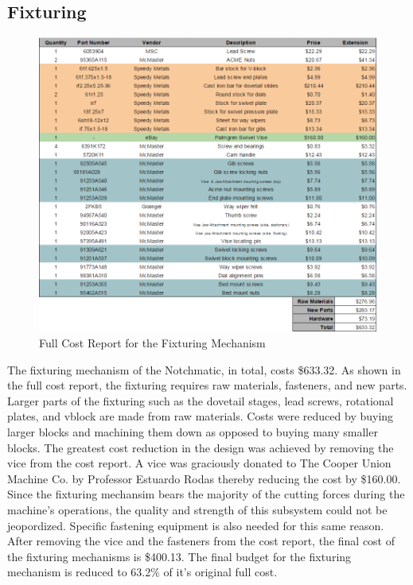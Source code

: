 \newpage

\subsection{Fixturing}

\begin{figure}[H]
    \centering
    \includegraphics[width=1.0\textwidth]{./images/Chapter4-BillofMaterials/CRF}
    \caption{Full Cost Report for the Fixturing Mechanism}
    \label{fig:CRD}
\end{figure}

The fixturing mechanism of the Notchmatic, in total, costs \$633.32. As shown in the full cost report, the fixturing requires raw materials, fasteners, and new parts. Larger parts of the fixturing such as the dovetail stages, lead screws, rotational plates, and vblock are made from raw materials. Costs were reduced by buying larger blocks and machining them down as opposed to buying many smaller blocks. The greatest cost reduction in the design was achieved by removing the vice from the cost report. A vice was graciously donated to The Cooper Union Machine Co. by Professor Estuardo Rodas thereby reducing the cost by \$160.00. Since the fixturing mechansim bears the majority of the cutting forces during the machine's operations, the quality and strength of this subsystem could not be jeopordized. Specific fastening equipment is also needed for this same reason. After removing the vice and the fasteners from the cost report, the final cost of the fixturing mechanisms is \$400.13. The final budget for the fixturing mechanism is reduced to 63.2\% of it's original full cost.  

